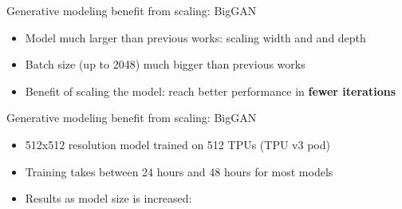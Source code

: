 \begin{frame}{Generative modeling benefit from scaling: BigGAN}
\protect\hypertarget{generative-modeling-benefit-from-scaling-biggan-1}{}

\begin{itemize}
\tightlist
\item
  Model much larger than previous works: scaling width and and depth
\item
  Batch size (up to 2048) much bigger than previous works
\item
  Benefit of scaling the model: reach better performance in
  \textbf{fewer iterations}
\end{itemize}


\end{frame}

\begin{frame}{Generative modeling benefit from scaling: BigGAN}
\protect\hypertarget{generative-modeling-benefit-from-scaling-biggan-2}{}

\begin{itemize}
\tightlist
\item
  512x512 resolution model trained on 512 TPUs (TPU v3 pod)
\item
  Training takes between 24 hours and 48 hours for most models
\item
  Results as model size is increased:
\end{itemize}

\end{frame}

